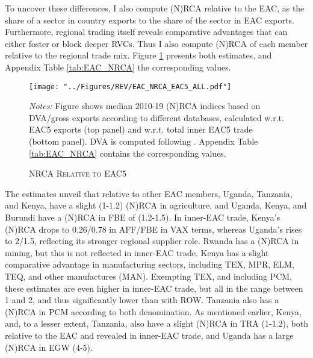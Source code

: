 \documentclass[a4paper]{article}
\begin{document}
To uncover these differences, I also compute (N)RCA relative to the EAC, as the share of a sector in country exports to the share of the sector in EAC exports. Furthermore, regional trading itself reveals comparative advantages that can either foster or block deeper RVCs. Thus I also compute (N)RCA of each member relative to the regional trade mix. Figure \ref{fig:EAC_NRCA} presents both estimates, and Appendix Table \ref{tab:EAC_NRCA} the corresponding values. 

\begin{figure}[h!]
\centering
\caption{\label{fig:EAC_NRCA}\textsc{NRCA Relative to EAC5}}
\texttt{[image: "../Figures/REV/EAC\_NRCA\_EAC5\_ALL.pdf"]} %
\raggedright
\scriptsize
\emph{Notes:} Figure shows median 2010-19 (N)RCA indices based on DVA/gross exports according to different databases, calculated w.r.t. EAC5 exports (top panel) and w.r.t. total inner EAC5 trade (bottom panel). DVA is computed following \citet{borin2019measuring}. Appendix Table \ref{tab:EAC_NRCA} contains the corresponding values.
\end{figure}
\FloatBarrier

The estimates unveil that relative to other EAC members, Uganda, Tanzania, and Kenya, have a slight (1-1.2) (N)RCA in agriculture, and Uganda, Kenya, and Burundi have a (N)RCA in FBE of (1.2-1.5). In inner-EAC trade, Kenya's (N)RCA drops to 0.26/0.78 in AFF/FBE in VAX terms, whereas Uganda's rises to 2/1.5, reflecting its stronger regional supplier role. Rwanda has a (N)RCA in mining, but this is not reflected in inner-EAC trade. Kenya has a slight comparative advantage in manufacturing sectors, including TEX, MPR, ELM, TEQ, and other manufactures (MAN). Exempting TEX, and including PCM, these estimates are even higher in inner-EAC trade, but all in the range between 1 and 2, and thus significantly lower than with ROW. Tanzania also has a (N)RCA in PCM according to both denomination. As mentioned earlier, Kenya, and, to a lesser extent, Tanzania, also have a slight (N)RCA in TRA (1-1.2), both relative to the EAC and revealed in inner-EAC trade, and Uganda has a large (N)RCA in EGW (4-5). \newline
\end{document}
